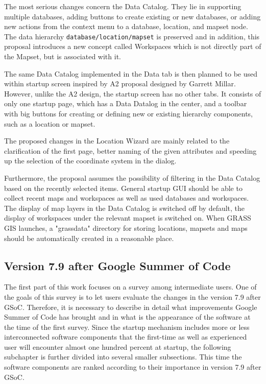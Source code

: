 \documentclass[a4paper,10pt,twoside]{article}
\begin{document}
The most serious changes concern the Data Catalog. They lie in supporting multiple databases, adding buttons to create existing or new databases, or adding new actions from the context menu to a database, location, and mapset node. The data hierarchy \texttt{database/location/mapset} is preserved and in addition, this proposal introduces a new concept called Workspaces which is not directly part of the Mapset, but is associated with it.

The same Data Catalog implemented in the Data tab is then planned to be used within startup screen inspired by A2 proposal designed by Garrett Millar. However, unlike the A2 design, the startup screen has no other tabs. It consists of only one startup page, which has a Data Datalog in the center, and a toolbar with big buttons for creating or defining new or existing hierarchy components, such as a location or mapset.

The proposed changes in the Location Wizard are mainly related to the clarification of the first page, better naming of the given attributes and speeding up the selection of the coordinate system in the dialog.

Furthermore, the proposal assumes the possibility of filtering in the Data Catalog based on the recently selected items. General startup GUI should be able to collect recent maps and workspaces as well as used databases and workspaces. The display of map layers in the Data Catalog is switched off by default, the display of workspaces under the relevant mapset is switched on. When GRASS GIS launches, a "grassdata" directory for storing locations, mapsets and maps should be automatically created in a reasonable place.


\subsection{Version 7.9 after Google Summer of Code}
\label{subsection:Version 7.9 after Google Summer of Code}
\noindent
The first part of this work focuses on a survey among intermediate users. One of the goals of this survey is to let users evaluate the changes in the version 7.9 after GSoC. Therefore, it is necessary to describe in detail what improvements Google Summer of Code has brought and in what is the appearance of the software at the time of the first survey.
Since the startup mechanism includes more or less interconnected software components that the first-time as well as experienced user will encounter almost one hundred percent at startup, the following subchapter is further divided into several smaller subsections. This time the software components are ranked according to their importance in version 7.9 after GSoC.
\end{document}
